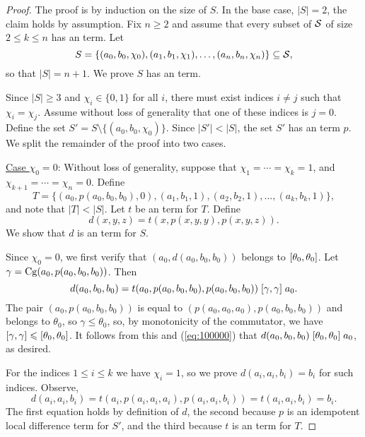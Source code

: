\begin{proof}

The proof is by induction on the size of $S$.  In the base case, $|S| = 2$,
the claim holds by assumption.
Fix $n\geq 2$ and assume that every subset of $\mathcal{S}$ of size $2\leq k \leq n$ has 
an \ld term. Let
\[
S = \{(a_0, b_0, \chi_0), (a_1, b_1, \chi_1), \dots, (a_{n}, b_{n},\chi_{n})\} 
\subseteq \mathcal{S},
\]
so that $|S| = n+1$.  We prove $S$ has an \ld term.

Since $|S| \geq 3$ and $\chi_i \in \{0,1\}$ for all $i$, there must exist
indices $i\neq j$ such that $\chi_i = \chi_j$. Assume without loss of generality
that one of these indices is $j=0$.  Define
the set
$S' = S \setminus \{(a_0, b_0, \chi_0)\}$.
Since $|S'| < |S|$, the set $S'$ has an \ld term $p$.
We split the remainder of the proof into two cases.

\medskip

\noindent \underline{Case $\chi_0 = 0$}:
Without loss of generality, suppose that $\chi_1 = %
\cdots =\chi_k = 1$,
and $\chi_{k+1} %
= \cdots = \chi_{n} = 0$. Define %
\[T = \{(a_0, p(a_0, b_0, b_0), 0),
(a_1, b_1, 1), (a_2, b_2, 1),
\dots, (a_k, b_k, 1)\},\] and
note that $|T| < |S|$.
Let $t$ be an \ld term for $T$.
Define
\[
d(x,y,z) = t(x, p(x,y,y), p(x,y,z)).
\]
We show that $d$ is an \ld term for $S$.

Since $\chi_0 =0$, we first verify that
$(a_0, d(a_0,b_0,b_0))$ belongs to $[\theta_0, \theta_0]$.
Let $\gamma = \operatorname{Cg}(a_0, p(a_0,b_0,b_0))$. 
Then
\begin{equation}
    \label{eq:100000}
  d(a_0,b_0,b_0) =
  t(a_0, p(a_0,b_0,b_0), p(a_0,b_0,b_0))\mathrel{[\gamma, \gamma]} a_0.
\end{equation}
The pair $(a_0, p(a_0,b_0,b_0))$ is equal to
$(p(a_0,a_0,a_0), p(a_0,b_0,b_0))$ and
belongs to $\theta_0$, so $\gamma\leq \theta_0$,
so,
by monotonicity of the commutator, we have
$[\gamma, \gamma] \leqslant [\theta_0, \theta_0]$.
It follows from this and (\ref{eq:100000}) that
$d(a_0,b_0,b_0)\mathrel{[\theta_0, \theta_0]} a_0$, as desired.

For the indices $1\leq i \leq k$ we have $\chi_i =1$, so we prove
$d(a_i,a_i,b_i) = b_i$ for such indices. Observe,
\[
  d(a_i,a_i,b_i) =
  t(a_i, p(a_i,a_i,a_i), p(a_i,a_i,b_i)) %
  =t(a_i, a_i, b_i) %
  =b_i. %
\]
The first equation holds by definition of $d$, the second
because $p$ is an idempotent local difference term for
$S'$, and the third because $t$ is an \ld term for $T$.


\end{proof}
